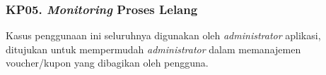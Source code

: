 \subsubsection{KP05. \textit{Monitoring} Proses Lelang}
\label{kp05}

	Kasus penggunaan ini seluruhnya digunakan oleh \textit{administrator} aplikasi, ditujukan untuk mempermudah \textit{administrator} dalam memanajemen voucher/kupon yang dibagikan oleh pengguna.

	
	
	
	
	